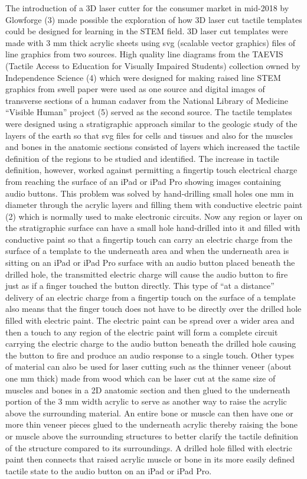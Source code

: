\documentclass[11.5pt]{sig-alternate} %
\begin{document}
\begin{large}
The introduction of a 3D laser cutter for the consumer market in mid-2018 by Glowforge (3) made possible the exploration of how 3D laser cut tactile templates could be designed for learning in the STEM field.  3D laser cut templates were made with 3 mm thick acrylic sheets using svg (scalable vector graphics) files of line graphics from two sources.  High quality line diagrams from the TAEVIS (Tactile Access to Education for Visually Impaired Students) collection owned by Independence Science (4) which were designed for making raised line STEM graphics from swell paper were used as one source and digital images of transverse sections of a human cadaver from the National Library of Medicine “Visible Human” project (5) served as the second source.  The tactile templates were designed using a stratigraphic approach similar to the geologic study of the layers of the earth so that svg files for cells and tissues and also for the muscles and bones in the anatomic sections consisted of layers which increased the tactile definition of the regions to be studied and identified.  The increase in tactile definition, however, worked against permitting a fingertip touch electrical charge from reaching the surface of an iPad or iPad Pro showing images containing audio buttons.  This problem was solved by hand-drilling small holes one mm in diameter through the acrylic layers and filling them with conductive electric paint (2) which is normally used to make electronic circuits.  Now any region or layer on the stratigraphic surface can have a small hole hand-drilled into it and filled with conductive paint so that a fingertip touch can carry an electric charge from the surface of a template to the underneath area and when the underneath area is sitting on an iPad or iPad Pro surface with an audio button placed beneath the drilled hole, the transmitted electric charge will cause the audio button to fire just as if a finger touched the button directly.  This type of “at a distance” delivery of an electric charge from a fingertip touch on the surface of a template also means that the finger touch does not have to be directly over the drilled hole filled with electric paint.  The electric paint can be spread over a wider area and then a touch to any region of the electric paint will form a complete circuit carrying the electric charge to the audio button beneath the drilled hole causing the button to fire and produce an audio response to a single touch.  Other types of material can also be used for laser cutting such as the thinner veneer (about one mm thick) made from wood which can be laser cut at the same size of muscles and bones in a 2D anatomic section and then glued to the underneath portion of the 3 mm width acrylic to serve as another way to raise the acrylic above the surrounding material.  An entire bone or muscle can then have one or more thin veneer pieces glued to the underneath acrylic thereby raising the bone or muscle above the surrounding structures to better clarify the tactile definition of the structure compared to its surroundings.  A drilled hole filled with electric paint then connects that raised acrylic muscle or bone in its more easily defined tactile state to the audio button on an iPad or iPad Pro.


\end{large}
\end{document}
